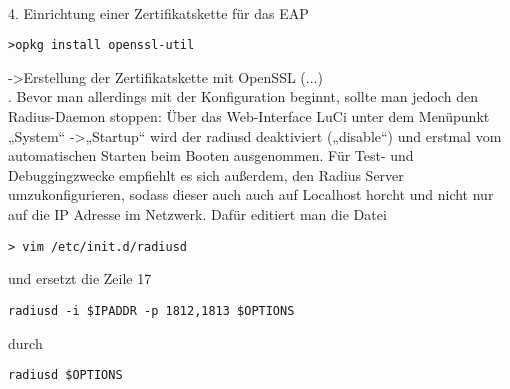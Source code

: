 ~\\
4. Einrichtung einer Zertifikatskette für das EAP
\begin{lstlisting}
>opkg install openssl-util
\end{lstlisting}
->Erstellung der Zertifikatskette mit OpenSSL (...)\\
. Bevor man allerdings mit der Konfiguration beginnt, sollte man jedoch den Radius-Daemon
stoppen: Über das Web-Interface LuCi unter dem Menüpunkt „System“ ->„Startup“ wird der
radiusd deaktiviert („disable“) und erstmal vom automatischen Starten beim Booten
ausgenommen. Für Test- und Debuggingzwecke empfiehlt es sich außerdem, den Radius Server
umzukonfigurieren, sodass dieser auch auch auf Localhost horcht und nicht nur auf die IP Adresse
im Netzwerk. Dafür editiert man die Datei
\begin{lstlisting}
> vim /etc/init.d/radiusd
\end{lstlisting}
und ersetzt die Zeile 17
\begin{lstlisting}
radiusd -i $IPADDR -p 1812,1813 $OPTIONS
\end{lstlisting}
durch
\begin{lstlisting}
radiusd $OPTIONS
\end{lstlisting}






















